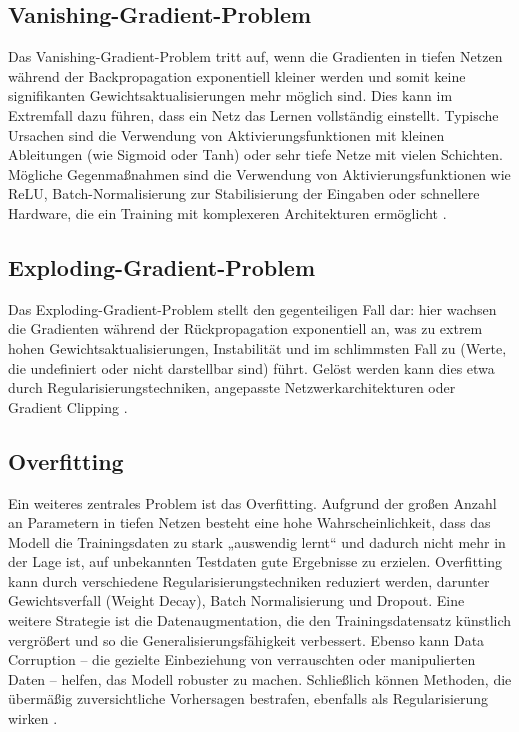 \subsection{Vanishing-Gradient-Problem}

Das Vanishing-Gradient-Problem tritt auf, wenn die Gradienten in tiefen Netzen während der Backpropagation exponentiell kleiner werden und somit keine signifikanten Gewichtsaktualisierungen mehr möglich sind. Dies kann im Extremfall dazu führen, dass ein Netz das Lernen vollständig einstellt. Typische Ursachen sind die Verwendung von Aktivierungsfunktionen mit kleinen Ableitungen (wie Sigmoid oder Tanh) oder sehr tiefe Netze mit vielen Schichten. Mögliche Gegenmaßnahmen sind die Verwendung von Aktivierungsfunktionen wie \acrshort{ReLU}, Batch-Normalisierung zur Stabilisierung der Eingaben oder schnellere Hardware, die ein Training mit komplexeren Architekturen ermöglicht \cite{Alzubaidi2021}.  

\subsection{Exploding-Gradient-Problem}

Das Exploding-Gradient-Problem stellt den gegenteiligen Fall dar: hier wachsen die Gradienten während der Rückpropagation exponentiell an, was zu extrem hohen Gewichtsaktualisierungen, Instabilität und im schlimmsten Fall zu  (Werte, die undefiniert oder nicht darstellbar sind) führt. Gelöst werden kann dies etwa durch Regularisierungstechniken, angepasste Netzwerkarchitekturen oder Gradient Clipping \cite{Alzubaidi2021}.  

\subsection{Overfitting}

Ein weiteres zentrales Problem ist das Overfitting. Aufgrund der großen Anzahl an Parametern in tiefen Netzen besteht eine hohe Wahrscheinlichkeit, dass das Modell die Trainingsdaten zu stark „auswendig lernt“ und dadurch nicht mehr in der Lage ist, auf unbekannten Testdaten gute Ergebnisse zu erzielen. Overfitting kann durch verschiedene Regularisierungstechniken reduziert werden, darunter Gewichtsverfall (Weight Decay), Batch Normalisierung und Dropout. Eine weitere Strategie ist die Datenaugmentation, die den Trainingsdatensatz künstlich vergrößert und so die Generalisierungsfähigkeit verbessert. Ebenso kann Data Corruption – die gezielte Einbeziehung von verrauschten oder manipulierten Daten – helfen, das Modell robuster zu machen. Schließlich können Methoden, die übermäßig zuversichtliche Vorhersagen bestrafen, ebenfalls als Regularisierung wirken \cite{Alzubaidi2021}.  

